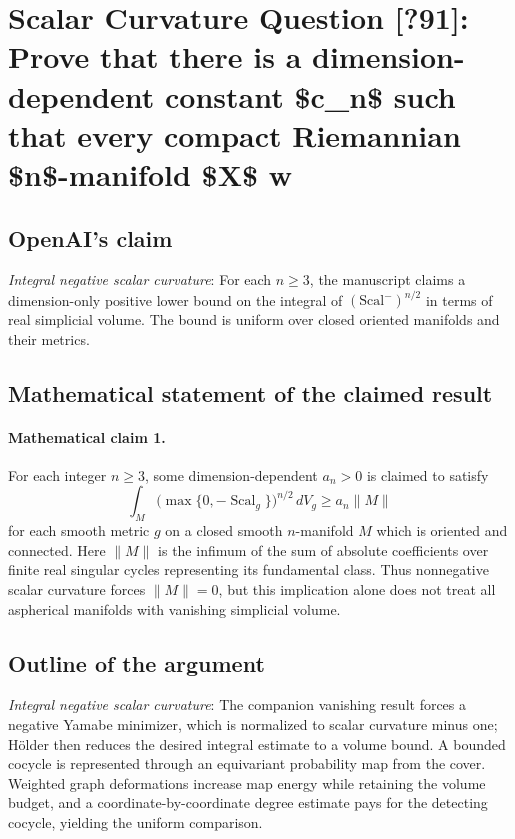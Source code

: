 \documentclass[11pt]{article}
\begin{document}
\section*{Scalar Curvature Question [?91]: Prove that there is a dimension-dependent constant \$c\_n\$ such that every compact Riemannian \$n\$-manifold \$X\$ w}

\subsection{OpenAI's claim}
\textit{Integral negative scalar curvature}: For each $n\ge3$, the manuscript claims a dimension-only positive lower bound on the integral of $(\mathrm{Scal}^-)^{n/2}$ in terms of real simplicial volume. The bound is uniform over closed oriented manifolds and their metrics.

\subsection{Mathematical statement of the claimed result}
\paragraph{Mathematical claim 1.} For each integer $n\ge3$, some dimension-dependent $a_n>0$ is claimed to satisfy \[\int_M\bigl(\max\{0,-\operatorname{Scal}_g\}\bigr)^{n/2}\,dV_g\ge a_n\|M\|\] for each smooth metric $g$ on a closed smooth $n$-manifold $M$ which is oriented and connected. Here $\|M\|$ is the infimum of the sum of absolute coefficients over finite real singular cycles representing its fundamental class. Thus nonnegative scalar curvature forces $\|M\|=0$, but this implication alone does not treat all aspherical manifolds with vanishing simplicial volume.

\subsection{Outline of the argument}
\textit{Integral negative scalar curvature}: The companion vanishing result forces a negative Yamabe minimizer, which is normalized to scalar curvature minus one; Hölder then reduces the desired integral estimate to a volume bound. A bounded cocycle is represented through an equivariant probability map from the cover. Weighted graph deformations increase map energy while retaining the volume budget, and a coordinate-by-coordinate degree estimate pays for the detecting cocycle, yielding the uniform comparison.
\end{document}
